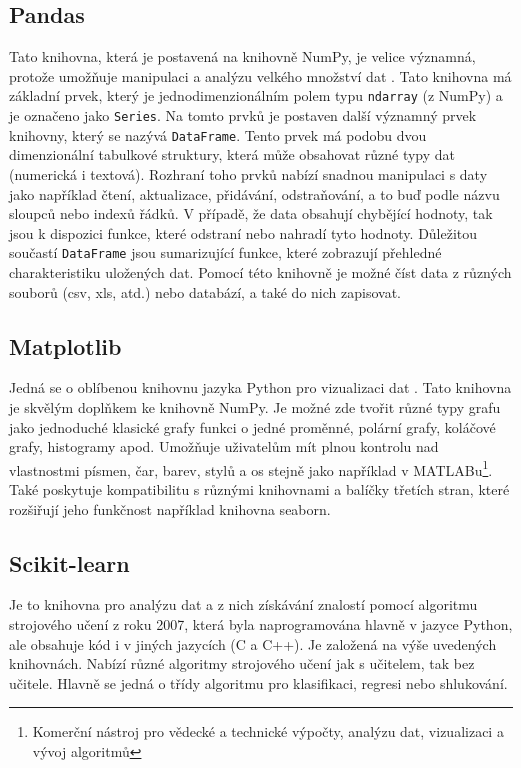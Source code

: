 \subsection*{Pandas}
Tato knihovna, která je postavená na knihovně NumPy, je velice významná, protože umožňuje manipulaci a analýzu velkého množství dat \cite{pandas}. Tato knihovna má základní prvek, který je jednodimenzionálním polem typu \verb|ndarray| (z NumPy) a je označeno jako \verb|Series|. Na tomto prvků je postaven další významný prvek knihovny, který se nazývá \verb|DataFrame|. Tento prvek má podobu dvou dimenzionální tabulkové struktury, která může obsahovat různé typy dat (numerická i textová). Rozhraní toho prvků nabízí snadnou manipulaci s daty jako například čtení, aktualizace, přidávání, odstraňování, a to buď podle názvu sloupců nebo indexů řádků. V případě, že data obsahují chybějící hodnoty, tak jsou k dispozici funkce, které odstraní nebo nahradí tyto hodnoty. Důležitou součastí \verb|DataFrame| jsou sumarizující funkce, které zobrazují přehledné charakteristiku uložených dat. Pomocí této knihovně je možné číst data z různých souborů (csv, xls, atd.) nebo databází, a také do nich zapisovat.

\subsection*{Matplotlib}
Jedná se o oblíbenou knihovnu jazyka Python pro vizualizaci dat \cite{matplotlib}. Tato knihovna je skvělým doplňkem ke knihovně NumPy. Je možné zde tvořit různé typy grafu jako jednoduché klasické grafy funkci o jedné proměnné, polární grafy, koláčové grafy, histogramy apod. Umožňuje uživatelům mít plnou kontrolu nad vlastnostmi písmen, čar, barev, stylů a os stejně jako například v MATLABu\footnote{Komerční nástroj pro vědecké a technické výpočty, analýzu dat, vizualizaci a vývoj algoritmů}. Také poskytuje kompatibilitu s různými knihovnami a balíčky třetích stran, které rozšiřují jeho funkčnost například knihovna seaborn.

\subsection*{Scikit-learn}
Je to knihovna pro analýzu dat a z nich získávání znalostí pomocí algoritmu strojového učení \cite{scikit-learn} z roku 2007, která byla naprogramována hlavně v jazyce Python, ale obsahuje kód i v jiných jazycích (C a C++). Je založená na výše uvedených knihovnách. Nabízí různé algoritmy strojového učení jak s učitelem, tak bez učitele. Hlavně se jedná o třídy algoritmu pro klasifikaci, regresi nebo shlukování. 

